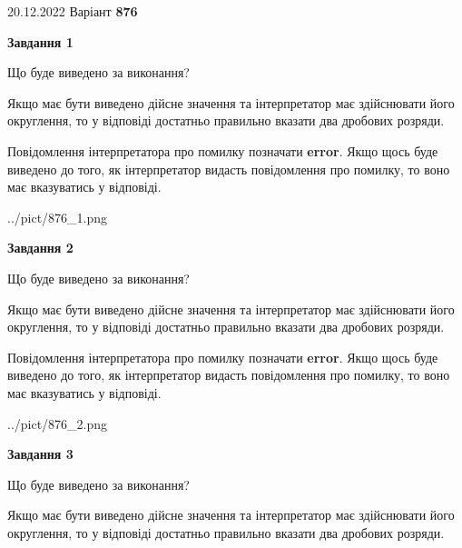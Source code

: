 \documentclass[12pt, ukrainian]{article}
\begin{document}
{20.12.2022 Варіант \No \textbf { 876 }\par}
{
\begin {Large}

{\begin {center}\textbf{Завдання 1}\end {center}}\par
Що буде виведено за виконання? \par

Якщо має бути виведено дійсне значення та інтерпретатор має здійснювати його округлення, 
то у відповіді достатньо правильно вказати два дробових розряди.

Повідомлення інтерпретатора про помилку позначати \textbf{error}.
Якщо щось буде виведено до того, як інтерпретатор видасть повідомлення про помилку, 
то воно має вказуватись у відповіді. \par

\begin{center}
	{../pict/876_1.png}
\end{center}
\newpage

{\begin {center}\textbf{Завдання 2}\end {center}}\par
Що буде виведено за виконання? \par

Якщо має бути виведено дійсне значення та інтерпретатор має здійснювати його округлення, 
то у відповіді достатньо правильно вказати два дробових розряди.

Повідомлення інтерпретатора про помилку позначати \textbf{error}.
Якщо щось буде виведено до того, як інтерпретатор видасть повідомлення про помилку, 
то воно має вказуватись у відповіді. \par

\begin{center}
	{../pict/876_2.png}
\end{center}
\newpage

{\begin {center}\textbf{Завдання 3}\end {center}}\par
Що буде виведено за виконання? \par

Якщо має бути виведено дійсне значення та інтерпретатор має здійснювати його округлення, 
то у відповіді достатньо правильно вказати два дробових розряди.


\end{Large}}
\end{document}
